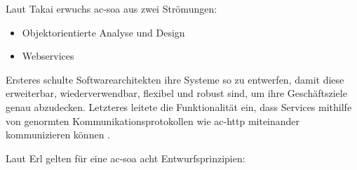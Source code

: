     Laut Takai erwuchs \gls{ac-soa} aus zwei Strömungen:
    \begin{itemize}
        \item Objektorientierte Analyse und Design
        \item Webservices
    \end{itemize}

    Ersteres schulte Softwarearchitekten ihre Systeme so zu entwerfen, damit diese erweiterbar, wiederverwendbar, flexibel und robust sind, um ihre Geschäftsziele genau abzudecken. Letzteres leitete die Funktionalität ein, dass Services mithilfe von genormten Kommunikationsprotokollen wie \gls{ac-http} miteinander kommunizieren können \parencite[S. 12]{takai2017architektur}.

    Laut Erl gelten für eine \gls{ac-soa} acht Entwurfsprinzipien:
